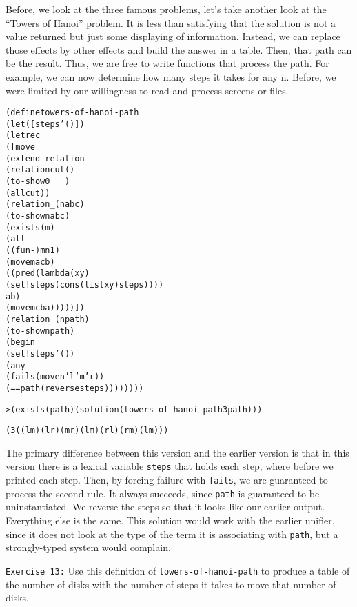 Before, we look at the three famous problems, let's take another look at
the ``Towers of Hanoi'' problem.  It is less than satisfying that the
solution is not a value returned but just some displaying of information.
Instead, we can replace those effects by other effects and build
the answer in a table.  Then, that path can be the result.  Thus, we are
free to write functions that process the path.  For example, we can now
determine how many steps it takes for any n.  Before, we were limited by
our willingness to read and process screens or files.
\newpage
\begin{alltt}
(define towers-of-hanoi-path
  (let ([steps '()])
    (letrec
      ([move
         (extend-relation
           (relation cut ()
             (to-show 0 _ _ _)
             (all cut))
           (relation _ (n a b c)
             (to-show n a b c)
             (exists (m)
               (all
                 ((fun -) m n 1)
                 (move m a c b)
                 ((pred (lambda (x y)
                          (set! steps (cons (list x y) steps))))
                  a b)
                 (move m c b a)))))])
      (relation _ (n path)
        (to-show n path)
        (begin
          (set! steps '())
          (any
            (fails (move n 'l 'm 'r))
            (== path (reverse steps))))))))
\end{alltt}

\begin{alltt}
> (exists (path) (solution (towers-of-hanoi-path 3 path)))

(3 ((l m) (l r) (m r) (l m) (r l) (r m) (l m)))
\end{alltt}

The primary difference between this version and the earlier version is that
in this version there is a lexical variable \texttt{steps} that holds each
step, where before we printed each step.  Then, by forcing failure with
\texttt{fails}, we are guaranteed to process the second rule.  It always
succeeds, since \texttt{path} is guaranteed to be uninstantiated. We
reverse the steps so that it looks like our earlier output. Everything else
is the same.  This solution would work with the earlier unifier, since it
does not look at the type of the term it is associating with \texttt{path},
but a strongly-typed system would complain.

\texttt{Exercise 13:} Use this definition of
\texttt{towers-of-hanoi-path} to produce a table of the number of
disks with the number of steps it takes to move that number of disks.

